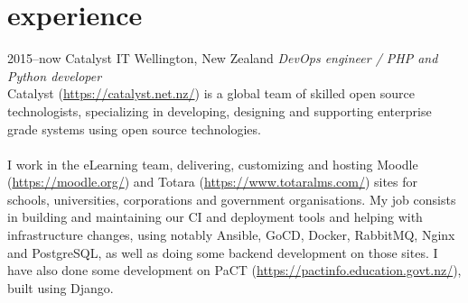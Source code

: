 \documentclass[]{friggeri-cv} %
\begin{document}
\section{experience}

\begin{entrylist}
\entry
{2015--now}
{Catalyst IT}
{Wellington, New Zealand}
{\emph{DevOps engineer / PHP and Python developer} \\
Catalyst (\url{https://catalyst.net.nz/}) is a global team of skilled open
    source technologists, specializing in developing, designing and supporting
    enterprise grade systems using open source technologies. \\
\\
I work in the eLearning team, delivering, customizing and hosting Moodle
    (\url{https://moodle.org/}) and Totara (\url{https://www.totaralms.com/})
    sites for schools, universities, corporations and government organisations.
    My job consists in building and maintaining our CI and deployment tools and
    helping with infrastructure changes, using notably Ansible, GoCD, Docker,
    RabbitMQ, Nginx and PostgreSQL, as well as doing some backend development
    on those sites. I have also done some development on PaCT
    (\url{https://pactinfo.education.govt.nz/}), built using Django.
}


\end{entrylist}
\end{document}
